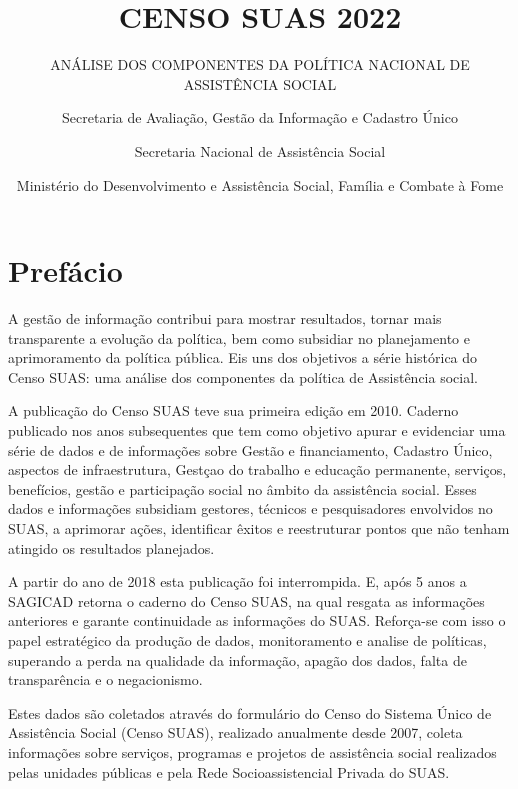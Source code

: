 \documentclass[
  brazilian]{report}
\title{CENSO SUAS 2022}
\subtitle{ANÁLISE DOS COMPONENTES DA POLÍTICA NACIONAL DE ASSISTÊNCIA
SOCIAL}
\author{Secretaria de Avaliação, Gestão da Informação e Cadastro
Único \and Secretaria Nacional de Assistência Social \and Ministério do
Desenvolvimento e Assistência Social, Família e Combate à Fome}
\date{}
\begin{document}
\maketitle

\renewcommand{\figurename}{Gráfico}

\captionsetup[figure]{labelfont=bf,textfont=bf}
\captionsetup[table]{labelfont=bf,textfont=bf}
\newcommand\fnote[1]{\captionsetup{font=small, textfont=normalfont}\caption*{#1}}
\captionsetup{justification=raggedright,singlelinecheck=false}

\hypertarget{prefuxe1cio}{%
\chapter*{Prefácio}\label{prefuxe1cio}}

A gestão de informação contribui para mostrar resultados, tornar mais
transparente a evolução da política, bem como subsidiar no planejamento
e aprimoramento da política pública. Eis uns dos objetivos a série
histórica do Censo SUAS: uma análise dos componentes da política de
Assistência social.

A publicação do Censo SUAS teve sua primeira edição em 2010. Caderno
publicado nos anos subsequentes que tem como objetivo apurar e
evidenciar uma série de dados e de informações sobre Gestão e
financiamento, Cadastro Único, aspectos de infraestrutura, Gestçao do
trabalho e educação permanente, serviços, benefícios, gestão e
participação social no âmbito da assistência social. Esses dados e
informações subsidiam gestores, técnicos e pesquisadores envolvidos no
SUAS, a aprimorar ações, identificar êxitos e reestruturar pontos que
não tenham atingido os resultados planejados.

A partir do ano de 2018 esta publicação foi interrompida. E, após 5 anos
a SAGICAD retorna o caderno do Censo SUAS, na qual resgata as
informações anteriores e garante continuidade as informações do SUAS.
Reforça-se com isso o papel estratégico da produção de dados,
monitoramento e analise de políticas, superando a perda na qualidade da
informação, apagão dos dados, falta de transparência e o negacionismo.

Estes dados são coletados através do formulário do Censo do Sistema
Único de Assistência Social (Censo SUAS), realizado anualmente desde
2007, coleta informações sobre serviços, programas e projetos de
assistência social realizados pelas unidades públicas e pela Rede
Socioassistencial Privada do SUAS.
\end{document}
